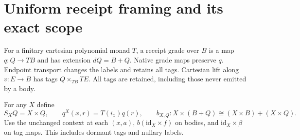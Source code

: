 \documentclass[11pt,a4paper]{article}
\theoremstyle{definition}
\newcommand{\id}{\mathrm{id}}
\begin{document}
\section{Uniform receipt framing and its exact scope}\label{sec:receipts}

For a finitary cartesian polynomial monad $T$, a receipt grade over $B$ is
a map $q:Q\to TB$ and has extension $dQ=B+Q$. Native grade maps preserve
$q$. Endpoint transport changes the labels and retains all tags. Cartesian
lift along $v:E\to B$ has tags $Q\times_{TB}TE$. All tags are retained,
including those never emitted by a body.

For any $X$ define
\begin{equation}\label{eq:receipt-frame}
 S_XQ=X\times Q,\qquad q^X(x,r)=T(i_x)q(r),\qquad
 b_{X,Q}:X\times(B+Q)\cong(X\times B)+(X\times Q).
\end{equation}
Use the unchanged context at each $(x,a)$, $b(\id_X\times f)$ on bodies,
and $\id_X\times\beta$ on tag maps. This includes dormant tags and
nullary labels.
\end{document}
